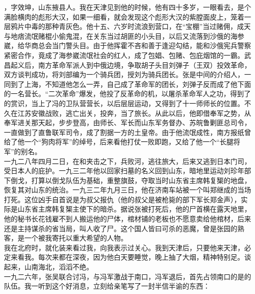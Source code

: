 ，字效坤，山东掖县人。我在天津见到他的时候，他有四十多岁，一眼看去，是个满脸横肉的彪形大汉，如果一细看，就会发现这个彪形大汉的紫膛面皮上，笼着一层鸦片中毒的那种青灰色。他十五、六岁时流浪到营口，在“宝棚”当过赌佣，成天与地痞流氓赌棍小偷鬼混，在关东当过胡匪的小头目，以后又流落到沙俄的海参崴，给华商总会当门警头目。由于他挥霍不吝和善于逢迎勾结，能和沙俄宪兵警察紧密合作，竟成了海参崴流氓社会的红人，成了包娼、包赌、包庇烟馆的一霸。武昌起义后，南方革命军派人到中俄边境，争取胡子头目刘弹子（王双）投效革命，双方谈判成功，将刘部编为一个骑兵团，授刘为骑兵团长。张是中间的介绍人，一同到了上海，不知道他怎么一弄，自己成了革命军的团长，刘弹子反而成了他下面的一名营长。“二次革命”爆发，他投了反革命的机，以屠杀革命军人之功，得到了的赏识，当上了冯的卫队营营长，以后层层运动，又得到了十一师师长的位置。不久在江苏安徽战败，逃亡出关，投奔，当了旅长。从此以后，他即借奉军之势，从奉军进关那天起，步步登高，由师长、军长而山东军务督办、苏皖鲁剿匪总司令，一直做到了直鲁联军司令，成了割据一方的土皇帝。由于他流氓成性，南方报纸曾给了他一个“狗肉将军”的绰号，后来看他打仗一败即跑，又给了他一个“长腿将军”的别名。\\

一九二八年四月二日，在和夹击之下，兵败河，逃往旅大，后来又逃到日本门司，受日本人的庇护。一九三二年他以回家扫墓的名义回到山东，暗地里运动刘珍年部下倒戈，打算以倒戈队伍为基础，重整旗鼓，夺取当时山东省主席韩复榘的地盘，恢复其对山东的统治。一九三二年九月三日，他在济南车站被一个叫郑继成的当场打死。这位凶手自首说是为叔父报仇（他的叔父是被枪毙的部下军长郑金声），实际是山东省主席韩复榘主使下的暗杀。据说张被打死后，他的尸首横在露天地里，他的秘书长花钱雇不到人搬运他的尸体，棺材铺的老板也不愿意卖给他棺材，后来还是主持谋杀的省当局，叫人收了尸。这个国人皆曰可杀的恶魔，曾是张园的熟客，是一个被我寄托以重大希望的人物。\\

我在北府时，就化装来看过我，向我表示过关心。我到天津后，只要他来天津，必定来看我。每次来都在深夜，因为他白天要睡觉，晚上抽了大烟，精神特别足。谈起来，山南海北，滔滔不绝。\\

一九二六年，张吴联合讨冯，与冯军激战于南口，冯军退后，首先占领南口的是的队伍。我一听到这个好消息，立刻给亲笔写了一封半信半谕的东西：\\

